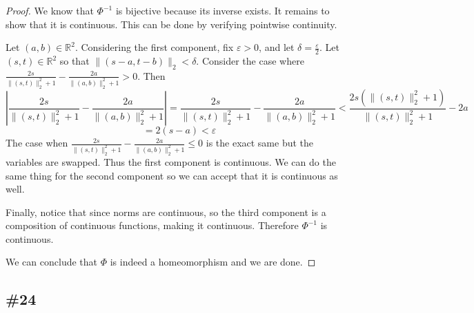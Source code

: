 \documentclass{article}
\theoremstyle{plain} %
\numberwithin{thm}{section} %
\theoremstyle{definition}
\begin{document}
\begin{proof}
            We know that \(\Phi ^{-1}\) is bijective because its inverse exists. It remains to show that it is continuous. This can be done by verifying pointwise continuity.

            Let \((a,b) \in \mathbb{R}^2\). Considering the first component, fix \(\varepsilon > 0\), and let \(\delta = \frac{\varepsilon}{2}\). Let \((s,t) \in \mathbb{R}^2\) so that \(\|(s - a, t - b)\|_2 < \delta\). Consider the case where \(\frac{2s}{\|(s,t)\| _2 ^2 + 1} - \frac{2a}{\|(a,b)\| _2 ^2 + 1} > 0\). Then
            \[
                \left\vert \frac{2s}{\|(s,t)\| _2 ^2 + 1} - \frac{2a}{\|(a,b)\| _2 ^2 + 1} \right\vert = \frac{2s}{\|(s,t)\| _2 ^2 + 1} - \frac{2a}{\|(a,b)\| _2 ^2 + 1} < \frac{2s(\|(s,t)\| _2^2 + 1)}{\|(s,t)\| _2 ^2 + 1} - 2a
            \]
            \[
                = 2(s-a) < \varepsilon
            \]
            The case when \(\frac{2s}{\|(s,t)\| _2 ^2 + 1} - \frac{2a}{\|(a,b)\| _2 ^2 + 1} \leq 0\) is the exact same but the variables are swapped. Thus the first component is continuous. We can do the same thing for the second component so we can accept that it is continuous as well.

            Finally, notice that since norms are continuous, so the third component is a composition of continuous functions, making it continuous. Therefore \(\Phi ^{-1}\) is continuous.

            We can conclude that \(\Phi\) is indeed a homeomorphism and we are done.
        \end{proof}

        \subsection{\#24}
\end{document}
